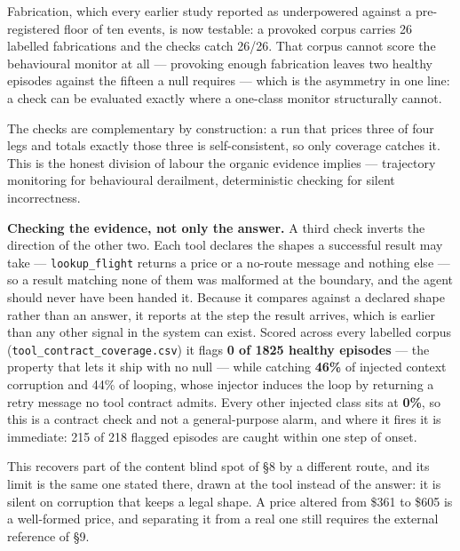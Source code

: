 \documentclass[11pt]{article}
\begin{document}
Fabrication, which every earlier study reported as underpowered against a pre-registered floor of ten events, is now testable: a provoked corpus carries 26 labelled fabrications and the checks catch 26/26. That corpus cannot score the behavioural monitor at all --- provoking enough fabrication leaves two healthy episodes against the fifteen a null requires --- which is the asymmetry in one line: a check can be evaluated exactly where a one-class monitor structurally cannot.


The checks are complementary by construction: a run that prices three of four legs and totals exactly those three is self-consistent, so only coverage catches it. This is the honest division of labour the organic evidence implies --- trajectory monitoring for behavioural derailment, deterministic checking for silent incorrectness.


\textbf{Checking the evidence, not only the answer.} A third check inverts the direction of the other two. Each tool declares the shapes a successful result may take --- \texttt{lookup\_\allowbreak{}flight} returns a price or a no-route message and nothing else --- so a result matching none of them was malformed at the boundary, and the agent should never have been handed it. Because it compares against a declared shape rather than an answer, it reports at the step the result arrives, which is earlier than any other signal in the system can exist. Scored across every labelled corpus (\texttt{tool\_\allowbreak{}contract\_\allowbreak{}coverage.csv}) it flags \textbf{0 of 1825 healthy episodes} --- the property that lets it ship with no null --- while catching \textbf{46\%} of injected context corruption and 44\% of looping, whose injector induces the loop by returning a retry message no tool contract admits. Every other injected class sits at \textbf{0\%}, so this is a contract check and not a general-purpose alarm, and where it fires it is immediate: 215 of 218 flagged episodes are caught within one step of onset.


This recovers part of the content blind spot of \S{}8 by a different route, and its limit is the same one stated there, drawn at the tool instead of the answer: it is silent on corruption that keeps a legal shape. A price altered from \$361 to \$605 is a well-formed price, and separating it from a real one still requires the external reference of \S{}9.
\end{document}
